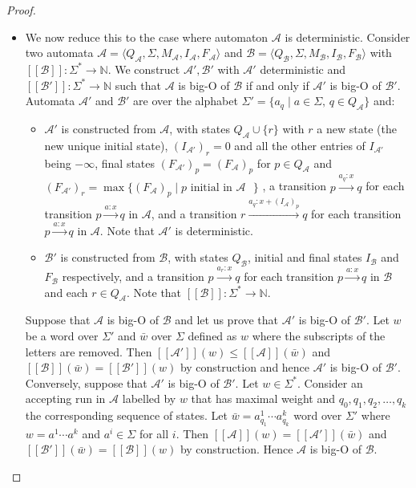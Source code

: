 \documentclass{lmcs}
\theoremstyle{remark}
\newcommand{\N}{\mathbb{N}}
\newcommand{\autA}{\mathcal{A}}
\newcommand{\autB}{\mathcal{B}}
\newcommand{\brfunc}[1]{[\![#1]\!]}
\newcommand{\funcA}{\brfunc{\autA}}
\newcommand{\funcB}{\brfunc{\autB}}
\theoremstyle{remark}
\begin{document}
\begin{proof}
\begin{itemize}
\item We now reduce this to the case where automaton $\autA$ is deterministic. Consider two automata $\autA = \langle Q_\autA, \Sigma, M_\autA, I_\autA, F_\autA\rangle$ and $\autB = \langle Q_\autB, \Sigma, M_\autB, I_\autB, F_\autB\rangle$ with $\brfunc{\autB}:\Sigma^* \to \N$. We construct $\autA',\autB'$ with $\autA'$ deterministic and $\brfunc{\autB'}:\Sigma^* \to \N$ such that $\autA$ is big-O of $\autB$ if and only if $\autA'$ is big-O of $\autB'$. Automata  $\autA'$ and $\autB'$ are over the alphabet $\Sigma' = \{a_q \mid a \in \Sigma\text{, } q \in Q_\autA \}$ and: 
\begin{itemize}
\item $\autA'$ is constructed from $\autA$, with states $Q_\autA \cup \{r\}$ with $r$ a new state (the new unique initial state), $(I_{\autA'})_r = 0$ and all the other entries of $I_{\autA'}$ being $-\infty$, final states $(F_{\autA'})_p = (F_{\autA})_p$ for $p\in Q_\autA$ and $(F_{\autA'})_r = \max\{(F_\autA)_p \mid p \text{ initial in $\autA$ }\}$ , a transition $p\xrightarrow{a_q:x}q$ for each transition $p\xrightarrow{a:x}q$ in $\autA$, and a transition $r\xrightarrow{a_q: x+(I_\autA)_p}q$ for each transition $p\xrightarrow{a:x}q$ in $\autA$. Note that $\autA'$ is deterministic.
\item  $\autB'$ is constructed from $\autB$, with states $Q_\autB$, initial and final states $I_\autB$ and $F_\autB$ respectively, and a transition $p\xrightarrow{a_r:x}q$ for each transition $p\xrightarrow{a:x}q$ in $\autB$ and each $r \in Q_\autA$. Note that $\brfunc{\autB}:\Sigma^* \to \N$.
\end{itemize}
Suppose that $\autA$ is big-O of $\autB$ and let us prove that $\autA'$ is big-O of $\autB'$. Let $w$ be a word over $\Sigma'$ and $\bar{w}$ over $\Sigma$ defined as $w$ where the subscripts of the letters are removed. Then $\brfunc{\autA'}(w) \leq \funcA(\bar{w})$ and $\funcB(\bar{w}) = \brfunc{\autB'}(w)$ by construction and hence $\autA'$ is big-O of $\autB'$. Conversely, suppose that $\autA'$ is big-O of $\autB'$. Let $w \in \Sigma^*$. Consider an accepting run in $\autA$ labelled by $w$ that has maximal weight and $q_0, q_1, q_2, \ldots, q_k$ the corresponding sequence of states. Let $\bar{w} = a^1_{q_1} \dotsm a^k_{q_k}$ word over $\Sigma'$ where $w = a^1 \dotsm a^k$ and $a^i \in \Sigma$ for all $i$. Then $\funcA(w) = \brfunc{\autA'}(\bar{w})$ and $\brfunc{\autB'}(\bar{w}) = \funcB(w)$ by construction. Hence $\autA$ is big-O of $\autB$.\qedhere
\end{itemize}
\end{proof}
\end{document}
